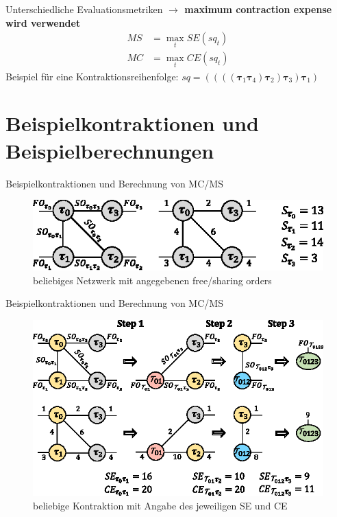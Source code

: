 \documentclass{beamer}
\begin{document}
		\begin{frame}{Unterschiedliche Evaluationsmetriken}
			\textbf{$\rightarrow$ maximum contraction expense wird verwendet}
			\begin{align*}
				MS &= \max_t SE(sq_t)\\ MC &= \max_t CE(sq_t)
			\end{align*}
			Beispiel für eine Kontraktionsreihenfolge:
			$sq = ((((\bm{\tau}_{1} \bm{\tau}_{4}) \bm{\tau}_{2}) \bm{\tau}_{3}) \bm{\tau}_{1})$
		\end{frame}


	\section{Beispielkontraktionen und Beispielberechnungen}
	
		\begin{frame}{Beispielkontraktionen und Berechnung von MC/MS}
			\begin{figure}
				\includegraphics{figure_03_a}
				\caption*{beliebiges Netzwerk mit angegebenen free/sharing orders}
			\end{figure}
		\end{frame}

		\begin{frame}{Beispielkontraktionen und Berechnung von MC/MS}
			\begin{figure}
				\includegraphics{figure_03_b}
				\caption*{beliebige Kontraktion mit Angabe des jeweiligen SE und CE}
			\end{figure}
		\end{frame}
\end{document}
